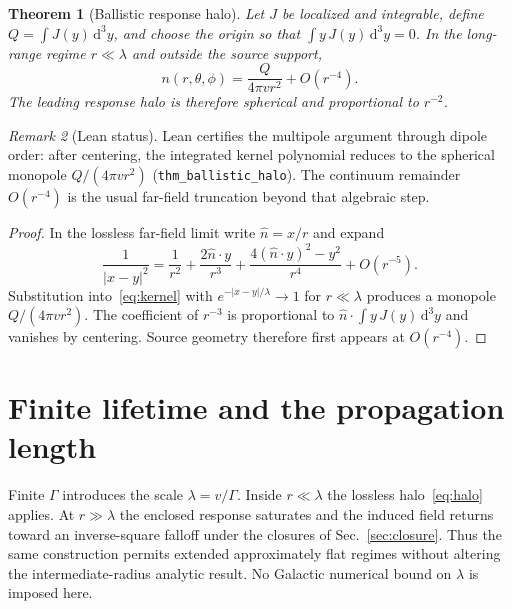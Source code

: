 \documentclass[11pt]{article}
\newtheorem{theorem}{Theorem}[section]
\theoremstyle{definition}
\theoremstyle{remark}
\newtheorem{remark}[theorem]{Remark}
\newcommand{\dd}{\mathrm{d}}
\begin{document}
\begin{theorem}[Ballistic response halo]
\label{thm:ballistic-halo}
Let $J$ be localized and integrable, define $Q=\int J(y)\,\dd^{3}y$, and choose the origin so that $\int y\,J(y)\,\dd^{3}y=0$.
In the long-range regime $r\ll\lambda$ and outside the source support,
\begin{equation}
  n(r,\theta,\phi)=\frac{Q}{4\pi v r^{2}}+O(r^{-4}).
  \label{eq:halo}
\end{equation}
The leading response halo is therefore spherical and proportional to $r^{-2}$.
\end{theorem}

\begin{remark}[Lean status]
\label{rem:halo-lean}
Lean certifies the multipole argument through dipole order: after centering, the integrated kernel polynomial reduces to the spherical monopole $Q/(4\pi v r^{2})$ (\texttt{thm\_ballistic\_halo}).
The continuum remainder $O(r^{-4})$ is the usual far-field truncation beyond that algebraic step.
\end{remark}

\begin{proof}
In the lossless far-field limit write $\hat n=x/r$ and expand
\begin{equation}
  \frac{1}{|x-y|^{2}}=\frac{1}{r^{2}}+\frac{2\hat n\cdot y}{r^{3}}+\frac{4(\hat n\cdot y)^{2}-y^{2}}{r^{4}}+O(r^{-5}).
\end{equation}
Substitution into~\eqref{eq:kernel} with $e^{-|x-y|/\lambda}\to1$ for $r\ll\lambda$ produces a monopole $Q/(4\pi v r^{2})$.
The coefficient of $r^{-3}$ is proportional to $\hat n\cdot\int y\,J(y)\,\dd^{3}y$ and vanishes by centering.
Source geometry therefore first appears at $O(r^{-4})$.
\end{proof}

\section{Finite lifetime and the propagation length}
\label{sec:lifetime}
Finite $\Gamma$ introduces the scale $\lambda=v/\Gamma$.
Inside $r\ll\lambda$ the lossless halo~\eqref{eq:halo} applies.
At $r\gg\lambda$ the enclosed response saturates and the induced field returns toward an inverse-square falloff under the closures of Sec.~\ref{sec:closure}.
Thus the same construction permits extended approximately flat regimes without altering the intermediate-radius analytic result.
No Galactic numerical bound on $\lambda$ is imposed here.
\end{document}
